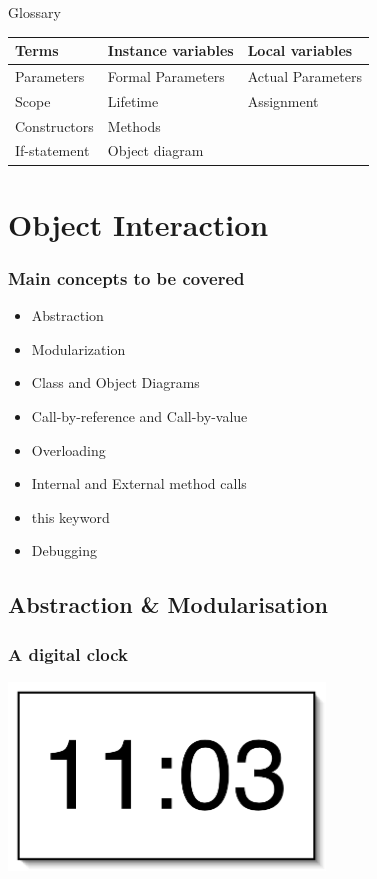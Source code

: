 \begin{frame}{Glossary}
\begin{tabular}{|l|l|l|}
\hline
Terms & Instance variables & Local variables\\
\hline
Parameters & Formal Parameters & Actual Parameters\\
\hline 
Scope & Lifetime & Assignment\\
\hline
Constructors & Methods & \\
\hline
If-statement & Object diagram & \\
\hline
\end{tabular}
\end{frame}

\section{Object Interaction}

\begin{frame}
\frametitle{Main concepts to be covered}
\begin{itemize}
\item Abstraction
\item Modularization
\item Class and Object Diagrams
\item Call-by-reference and Call-by-value
\item Overloading
\item Internal and External method calls
\item this keyword
\item Debugging
\end{itemize}
\end{frame}

\subsection{Abstraction \& Modularisation}

\begin{frame}
\frametitle{A digital clock}
\begin{center}
\includegraphics[height=5cm,keepaspectratio]{./figures/clock}
\end{center}
\end{frame}

